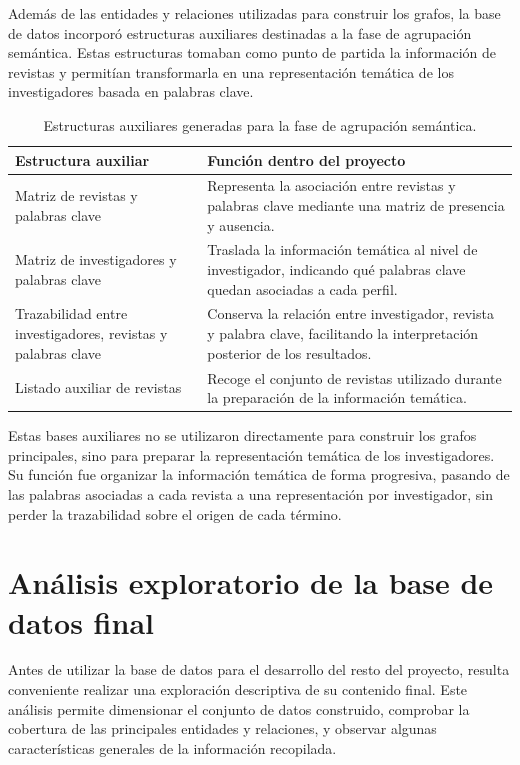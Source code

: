\documentclass[11pt,spanish,listoffigures,listoftables]{tfgetsinf}
\begin{document}
Además de las entidades y relaciones utilizadas para construir los grafos, la base de datos incorporó estructuras auxiliares destinadas a la fase de agrupación semántica. Estas estructuras tomaban como punto de partida la información de revistas y permitían transformarla en una representación temática de los investigadores basada en palabras clave.

\begin{table}[H]
\centering
\small
\renewcommand{\arraystretch}{1.25}
\begin{tabularx}{\textwidth}{
>{\raggedright\arraybackslash}p{4.5cm}
>{\raggedright\arraybackslash}X
}
\toprule
\textbf{Estructura auxiliar} & \textbf{Función dentro del proyecto} \\
\midrule
Matriz de revistas y palabras clave 
& Representa la asociación entre revistas y palabras clave mediante una matriz de presencia y ausencia. \\
\midrule
Matriz de investigadores y palabras clave 
& Traslada la información temática al nivel de investigador, indicando qué palabras clave quedan asociadas a cada perfil. \\
\midrule
Trazabilidad entre investigadores, revistas y palabras clave 
& Conserva la relación entre investigador, revista y palabra clave, facilitando la interpretación posterior de los resultados. \\
\midrule
Listado auxiliar de revistas 
& Recoge el conjunto de revistas utilizado durante la preparación de la información temática. \\
\bottomrule
\end{tabularx}
\caption{Estructuras auxiliares generadas para la fase de agrupación semántica.}
\end{table}

Estas bases auxiliares no se utilizaron directamente para construir los grafos principales, sino para preparar la representación temática de los investigadores. Su función fue organizar la información temática de forma progresiva, pasando de las palabras asociadas a cada revista a una representación por investigador, sin perder la trazabilidad sobre el origen de cada término.

\section{Análisis exploratorio de la base de datos final}

Antes de utilizar la base de datos para el desarrollo del resto del proyecto, resulta conveniente realizar una exploración descriptiva de su contenido final. Este análisis permite dimensionar el conjunto de datos construido, comprobar la cobertura de las principales entidades y relaciones, y observar algunas características generales de la información recopilada.
\end{document}

